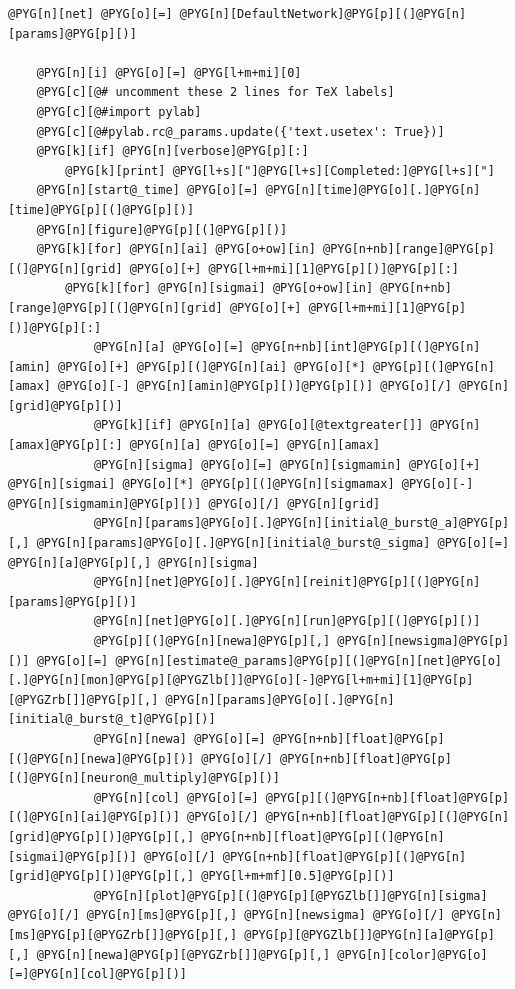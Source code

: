 \documentclass[letterpaper,10pt,english]{manual}
\begin{document}
\begin{Verbatim}[commandchars=@\[\]]
    @PYG[n][net] @PYG[o][=] @PYG[n][DefaultNetwork]@PYG[p][(]@PYG[n][params]@PYG[p][)]

    @PYG[n][i] @PYG[o][=] @PYG[l+m+mi][0]
    @PYG[c][@# uncomment these 2 lines for TeX labels]
    @PYG[c][@#import pylab]
    @PYG[c][@#pylab.rc@_params.update({'text.usetex': True})]
    @PYG[k][if] @PYG[n][verbose]@PYG[p][:]
        @PYG[k][print] @PYG[l+s]["]@PYG[l+s][Completed:]@PYG[l+s]["]
    @PYG[n][start@_time] @PYG[o][=] @PYG[n][time]@PYG[o][.]@PYG[n][time]@PYG[p][(]@PYG[p][)]
    @PYG[n][figure]@PYG[p][(]@PYG[p][)]
    @PYG[k][for] @PYG[n][ai] @PYG[o+ow][in] @PYG[n+nb][range]@PYG[p][(]@PYG[n][grid] @PYG[o][+] @PYG[l+m+mi][1]@PYG[p][)]@PYG[p][:]
        @PYG[k][for] @PYG[n][sigmai] @PYG[o+ow][in] @PYG[n+nb][range]@PYG[p][(]@PYG[n][grid] @PYG[o][+] @PYG[l+m+mi][1]@PYG[p][)]@PYG[p][:]
            @PYG[n][a] @PYG[o][=] @PYG[n+nb][int]@PYG[p][(]@PYG[n][amin] @PYG[o][+] @PYG[p][(]@PYG[n][ai] @PYG[o][*] @PYG[p][(]@PYG[n][amax] @PYG[o][-] @PYG[n][amin]@PYG[p][)]@PYG[p][)] @PYG[o][/] @PYG[n][grid]@PYG[p][)]
            @PYG[k][if] @PYG[n][a] @PYG[o][@textgreater[]] @PYG[n][amax]@PYG[p][:] @PYG[n][a] @PYG[o][=] @PYG[n][amax]
            @PYG[n][sigma] @PYG[o][=] @PYG[n][sigmamin] @PYG[o][+] @PYG[n][sigmai] @PYG[o][*] @PYG[p][(]@PYG[n][sigmamax] @PYG[o][-] @PYG[n][sigmamin]@PYG[p][)] @PYG[o][/] @PYG[n][grid]
            @PYG[n][params]@PYG[o][.]@PYG[n][initial@_burst@_a]@PYG[p][,] @PYG[n][params]@PYG[o][.]@PYG[n][initial@_burst@_sigma] @PYG[o][=] @PYG[n][a]@PYG[p][,] @PYG[n][sigma]
            @PYG[n][net]@PYG[o][.]@PYG[n][reinit]@PYG[p][(]@PYG[n][params]@PYG[p][)]
            @PYG[n][net]@PYG[o][.]@PYG[n][run]@PYG[p][(]@PYG[p][)]
            @PYG[p][(]@PYG[n][newa]@PYG[p][,] @PYG[n][newsigma]@PYG[p][)] @PYG[o][=] @PYG[n][estimate@_params]@PYG[p][(]@PYG[n][net]@PYG[o][.]@PYG[n][mon]@PYG[p][@PYGZlb[]]@PYG[o][-]@PYG[l+m+mi][1]@PYG[p][@PYGZrb[]]@PYG[p][,] @PYG[n][params]@PYG[o][.]@PYG[n][initial@_burst@_t]@PYG[p][)]
            @PYG[n][newa] @PYG[o][=] @PYG[n+nb][float]@PYG[p][(]@PYG[n][newa]@PYG[p][)] @PYG[o][/] @PYG[n+nb][float]@PYG[p][(]@PYG[n][neuron@_multiply]@PYG[p][)]
            @PYG[n][col] @PYG[o][=] @PYG[p][(]@PYG[n+nb][float]@PYG[p][(]@PYG[n][ai]@PYG[p][)] @PYG[o][/] @PYG[n+nb][float]@PYG[p][(]@PYG[n][grid]@PYG[p][)]@PYG[p][,] @PYG[n+nb][float]@PYG[p][(]@PYG[n][sigmai]@PYG[p][)] @PYG[o][/] @PYG[n+nb][float]@PYG[p][(]@PYG[n][grid]@PYG[p][)]@PYG[p][,] @PYG[l+m+mf][0.5]@PYG[p][)]
            @PYG[n][plot]@PYG[p][(]@PYG[p][@PYGZlb[]]@PYG[n][sigma] @PYG[o][/] @PYG[n][ms]@PYG[p][,] @PYG[n][newsigma] @PYG[o][/] @PYG[n][ms]@PYG[p][@PYGZrb[]]@PYG[p][,] @PYG[p][@PYGZlb[]]@PYG[n][a]@PYG[p][,] @PYG[n][newa]@PYG[p][@PYGZrb[]]@PYG[p][,] @PYG[n][color]@PYG[o][=]@PYG[n][col]@PYG[p][)]

\end{Verbatim}
\end{document}
